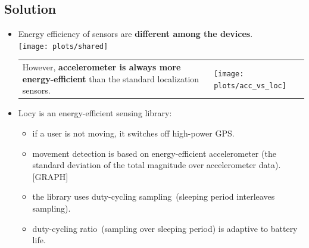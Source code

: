 \documentclass[a2,landscape]{a0poster}
\begin{document}
\mbox{}\framebreak
\begin{center}
\section*{Solution}
\end{center}
\begin{itemize}
   \item Energy efficiency of sensors are \textbf{different among the devices}.\\
   \texttt{[image: plots/shared]}
   

 \begin{tabular}[t]{p{8.0cm} p{9.0cm}}
       \vspace{0cm} However, \textbf{accelerometer is always more energy-efficient} than the standard localization sensors. & \vspace{0cm}\texttt{[image: plots/acc\_vs\_loc]}
      \end{tabular}
      


   \item Locy is an energy-efficient sensing library:
  	   \begin{itemize}		
  	   \item if a user is not moving, it switches off high-power GPS. 
  	   \item movement detection is based on energy-efficient accelerometer (the standard deviation of the total magnitude over accelerometer data). [GRAPH]
  	   \item the library uses duty-cycling sampling\ (sleeping period interleaves sampling).
  	   \item duty-cycling ratio\ (sampling over sleeping period) is adaptive to battery life. 
    \end{itemize} 
  \end{itemize}
\end{document}
